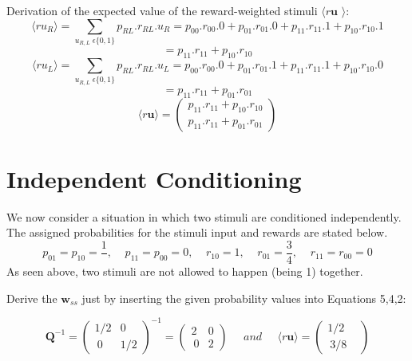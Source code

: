 \documentclass{article}
\begin{document}
Derivation of the expected value of the reward-weighted stimuli $\langle r \textbf{u } \rangle$:
\begin{equation*}
 \langle r u_R \rangle =\sum_{u_{R,L} \; \epsilon\{0,1\}} p_{RL}.r_{RL}.u_R=p_{00}.r_{00}.0+p_{01}.r_{01}.0+p_{11}.r_{11}.1+p_{10}.r_{10}.1
\end{equation*}
\begin{equation*}
=p_{11}.r_{11}+p_{10}.r_{10}
\end{equation*}
\begin{equation*}
 \langle r u_L \rangle =\sum_{u_{R,L} \; \epsilon\{0,1\}} p_{RL}.r_{RL}.u_L=p_{00}.r_{00}.0+p_{01}.r_{01}.1+p_{11}.r_{11}.1+p_{10}.r_{10}.0 
\end{equation*}
\begin{equation*}
=p_{11}.r_{11}+p_{01}.r_{01}
\end{equation*}
\begin{equation}
 \langle r \textbf{u} \rangle= \left ( \begin{array}{cc}  p_{11}.r_{11}+p_{10}.r_{10} \\ p_{11}.r_{11}+p_{01}.r_{01} \end{array} \right )
\end{equation} 
\section{Independent Conditioning}
We now consider a situation in which two stimuli are conditioned independently. The assigned probabilities for the stimuli input and rewards are stated below. 
\begin{equation*}
 p_{01}=p_{10}=\frac{1}{}, \;\;\;\; p_{11}=p_{00}=0, \;\;\;\;r_{10}=1, \;\;\;\;r_{01}=\frac{3}{4}, \;\;\;\; r_{11}=r_{00}=0
\end{equation*}
As seen above, two stimuli are not allowed to happen (being 1) together. 

Derive the $\textbf{w}_{ss}$ just by inserting the given probability values into Equations 5,4,2: 

\begin{equation*}
\textbf{Q}^{-1}= \left ( \begin{array}{cc}  1/2 & 0 \\ \ 0 & 1/2  \end{array} \right )^{-1}=\left ( \begin{array}{cc}  2 & 0 \\ \ 0 & 2  \end{array} \right )  \;\;\;\;\; and \;\;\;\;\; \langle r \textbf{u} \rangle= \left ( \begin{array}{cc}  1/2  \\ \ 3/8 &  \end{array} \right )
\end{equation*}
\end{document}
